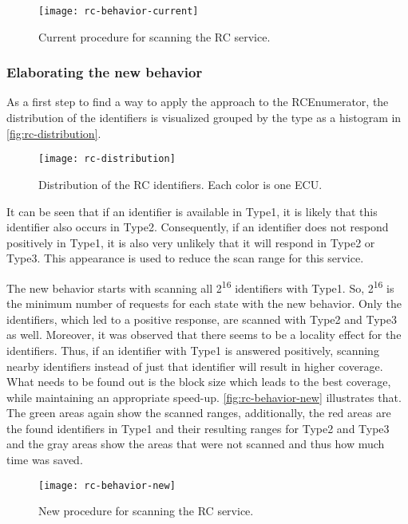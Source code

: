 \begin{figure}[h]
    \centering
    \texttt{[image: rc-behavior-current]}
    \caption{Current procedure for scanning the RC service.}
    \label{fig:rc-behavior-current}
\end{figure}

\subsubsection{Elaborating the new behavior}

As a first step to find a way to apply the approach to the RCEnumerator, the distribution of the identifiers is visualized grouped by the type as a histogram in \autoref{fig:rc-distribution}.

\begin{figure}[h]
    \centering
    \texttt{[image: rc-distribution]}
    \caption{Distribution of the RC identifiers. Each color is one ECU.}
    \label{fig:rc-distribution}
\end{figure}

It can be seen that if an identifier is available in Type1, it is likely that this identifier also occurs in Type2. Consequently, if an identifier does not respond positively in Type1, it is also very unlikely that it will respond in Type2 or Type3. This appearance is used to reduce the scan range for this service.

The new behavior starts with scanning all 2\textsuperscript{16} identifiers with Type1. So, 2\textsuperscript{16} is the minimum number of requests for each state with the new behavior. Only the identifiers, which led to a positive response, are scanned with Type2 and Type3 as well. Moreover, it was observed that there seems to be a locality effect for the identifiers. Thus, if an identifier with Type1 is answered positively, scanning nearby identifiers instead of just that identifier will result in higher coverage. What needs to be found out is the block size which leads to the best coverage, while maintaining an appropriate speed-up. \autoref{fig:rc-behavior-new} illustrates that. The green areas again show the scanned ranges, additionally, the red areas are the found identifiers in Type1 and their resulting ranges for Type2 and Type3 and the gray areas show the areas that were not scanned and thus how much time was saved.

\begin{figure}[h]
    \centering
    \texttt{[image: rc-behavior-new]}
    \caption{New procedure for scanning the RC service.}
    \label{fig:rc-behavior-new}
\end{figure}

